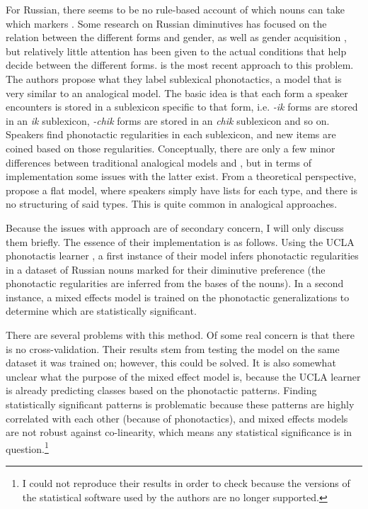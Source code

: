 For Russian, there seems to be no rule-based account of which nouns can take which markers \autocite{Gouskova.2015}. Some research on Russian diminutives has focused on the relation between the different forms and gender, as well as gender acquisition \autocites{Kempe.2010, Protassova.2007, Voeykova.1998}, but relatively little attention has been given to the actual conditions that help decide between the different forms. \textcite{Gouskova.2015} is the most recent approach to this problem. The authors propose what they label sublexical phonotactics, a model that is very similar to an analogical model. The basic idea is that each form a speaker encounters is stored in a sublexicon specific to that form, i.e. \textit{-ik} forms are stored in an \textit{ik} sublexicon, \textit{-chik} forms are stored in an \textit{chik} sublexicon and so on. Speakers find phonotactic regularities in each sublexicon, and new items are coined based on those regularities. Conceptually, there are only a few minor differences between traditional analogical models and , but in terms of implementation some issues with the latter exist. From a theoretical perspective, \textcite{Gouskova.2015} propose a flat model, where speakers simply have lists for each type, and there is no structuring of said types. This is quite common in analogical approaches. %

Because the issues with  approach are of secondary concern, I will only discuss them briefly. The essence of their implementation is as follows. Using the UCLA phonotactis learner \autocite{Hayes.2008}, a first instance of their model infers phonotactic regularities in a dataset of Russian nouns marked for their diminutive preference (the phonotactic regularities are inferred from the bases of the nouns). In a second instance, a mixed effects model is trained on the phonotactic generalizations to determine which are statistically significant.

\largerpage[-1]
There are several problems with this method. Of some real concern is that there is no cross-validation. Their results stem from testing the model on the same dataset it was trained on; however, this could be solved. It is also somewhat unclear what the purpose of the mixed effect model is, because the UCLA learner is already predicting classes based on the phonotactic patterns. Finding statistically significant patterns is problematic because these patterns are highly correlated with each other (because of phonotactics), and mixed effects models are not robust against co-linearity, which means any statistical significance is in question.\footnote{I could not reproduce their results in order to check because the versions of the statistical software used by the authors are no longer supported.}

